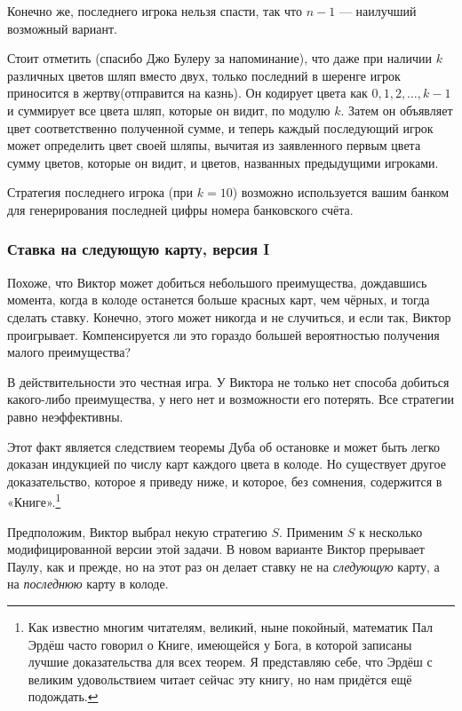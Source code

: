 Конечно же, последнего игрока нельзя спасти, так что $n-1$ --- наилучший возможный вариант.
\heart

Стоит отметить (спасибо Джо Булеру %
за напоминание), что даже при наличии $k$ различных цветов шляп вместо двух, только последний в шеренге игрок приносится в жертву(отправится на казнь).
Он кодирует цвета как $0, 1, 2, \dots, k-1$ и суммирует все цвета шляп, которые он видит, по модулю $k$.
Затем он объявляет цвет соответственно полученной сумме, и теперь каждый последующий игрок может определить цвет своей шляпы, вычитая из заявленного первым цвета сумму цветов, которые он видит, и цветов, названных предыдущими игроками.

Стратегия последнего игрока (при $k=10$) возможно используется вашим банком для генерирования последней цифры номера банковского счёта.

\subsubsection*{Ставка на следующую карту, версия I}%

Похоже, что Виктор может добиться небольшого преимущества, дождавшись момента, когда в колоде останется больше красных карт, чем чёрных, и тогда сделать ставку.
Конечно, этого может никогда и не случиться, и если так, Виктор проигрывает.
Компенсируется ли это гораздо большей вероятностью получения малого преимущества?

В действительности это честная игра.
У Виктора не только нет способа добиться какого-либо преимущества, у него нет и возможности его потерять.
Все стратегии равно неэффективны.

Этот факт является следствием теоремы Дуба об остановке %
и может быть легко доказан индукцией по числу карт каждого цвета в колоде.
Но существует другое доказательство, которое я приведу ниже, и которое, без сомнения, содержится в «Книге».\footnote{Как известно многим читателям, великий, ныне покойный, математик Пал Эрдёш часто говорил о Книге, имеющейся у Бога, в которой записаны лучшие доказательства для всех теорем.
Я представляю себе, что Эрдёш с великим удовольствием читает сейчас эту книгу, но нам придётся ещё подождать.}

Предположим, Виктор выбрал некую стратегию $S$.
Применим $S$ к несколько модифицированной версии этой задачи.
В новом варианте Виктор прерывает Паулу, как и прежде, но на этот раз он делает ставку не на \emph{следующую} карту, а на \emph{последнюю} карту в колоде.

